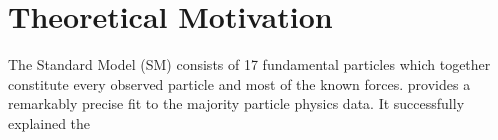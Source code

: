 \chapter{Theoretical Motivation}

The Standard Model (SM) consists of 17 fundamental particles which together constitute every observed particle and most of the known forces. provides a remarkably precise fit to the majority particle physics data. It successfully explained the 




